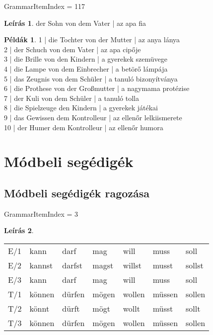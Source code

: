 \documentclass{article}
\theoremstyle{definition}
\newtheorem*{exmp}{Példák}
\newtheorem*{desc}{Leírás}
\begin{document}
GrammarItemIndex = 117

\begin{desc}
der Sohn von dem Vater | az apa fia
\end{desc}

\begin{exmp}
1 | die Tochter von der Mutter | az anya lánya\\
2 | der Schuch von dem Vater | az apa cipője\\
3 | die Brille von den Kindern | a gyerekek szemüvege\\
4 | die Lampe von dem Einbrecher | a betörő lámpája\\
5 | das Zeugnis von dem Schüler | a tanuló bizonyítványa\\
6 | die Prothese von der Großmutter | a nagymama protézise\\
7 | der Kuli von dem Schüler | a tanuló tolla\\
8 | die Spielzeuge den Kindern | a gyerekek játékai\\
9 | das Gewissen dem Kontrolleur | az ellenőr lelkiismerete\\
10 | der Humer dem Kontrolleur | az ellenőr humora\\
\end{exmp}

\section{Módbeli segédigék}

\subsection{Módbeli segédigék ragozása}

GrammarItemIndex = 3

\begin{desc}
\begin{tabular}{lllllll}
E/1 & kann & darf & mag & will & muss & soll \\
E/2 & kannst & darfst & magst & willst & musst & sollst \\
E/3 & kann & darf & mag & will & muss & soll \\
T/1 & können & dürfen & mögen & wollen & müssen & sollen \\
T/2 & könnt & dürft & mögt & wollt & müsst & sollt \\
T/3 & können & dürfen & mögen & wollen & müssen & sollen \\
\end{tabular}
\end{desc}
\end{document}
